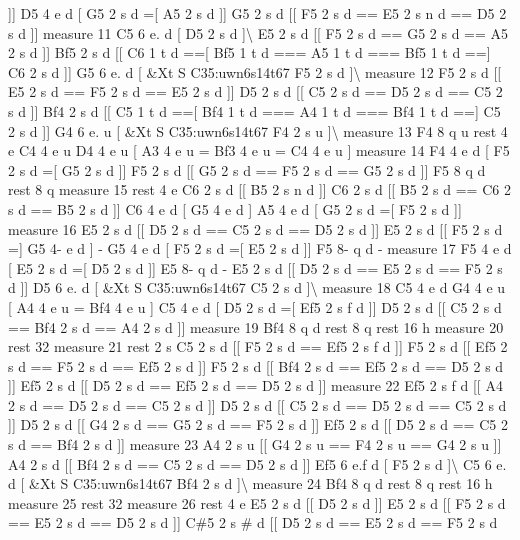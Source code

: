 \mbox{]}\mbox{]} D5 4 e d \mbox{[} G5 2 s d =\mbox{[} A5 2 s d \mbox{]}\mbox{]} G5 2 s d \mbox{[}\mbox{[} F5 2 s d == E5 2 s n d == D5 2 s d \mbox{]}\mbox{]} measure 11 C5 6 e. d \mbox{[} D5 2 s d \mbox{]}\textbackslash{} E5 2 s d \mbox{[}\mbox{[} F5 2 s d == G5 2 s d == A5 2 s d \mbox{]}\mbox{]} Bf5 2 s d \mbox{[}\mbox{[} C6 1 t d ==\mbox{[} Bf5 1 t d === A5 1 t d === Bf5 1 t d ==\mbox{]} C6 2 s d \mbox{]}\mbox{]} G5 6 e. d \mbox{[} \&Xt S C35\+:uwn6s14t67 F5 2 s d \mbox{]}\textbackslash{} measure 12 F5 2 s d \mbox{[}\mbox{[} E5 2 s d == F5 2 s d == E5 2 s d \mbox{]}\mbox{]} D5 2 s d \mbox{[}\mbox{[} C5 2 s d == D5 2 s d == C5 2 s d \mbox{]}\mbox{]} Bf4 2 s d \mbox{[}\mbox{[} C5 1 t d ==\mbox{[} Bf4 1 t d === A4 1 t d === Bf4 1 t d ==\mbox{]} C5 2 s d \mbox{]}\mbox{]} G4 6 e. u \mbox{[} \&Xt S C35\+:uwn6s14t67 F4 2 s u \mbox{]}\textbackslash{} measure 13 F4 8 q u rest 4 e C4 4 e u D4 4 e u \mbox{[} A3 4 e u = Bf3 4 e u = C4 4 e u \mbox{]} measure 14 F4 4 e d \mbox{[} F5 2 s d =\mbox{[} G5 2 s d \mbox{]}\mbox{]} F5 2 s d \mbox{[}\mbox{[} G5 2 s d == F5 2 s d == G5 2 s d \mbox{]}\mbox{]} F5 8 q d rest 8 q measure 15 rest 4 e C6 2 s d \mbox{[}\mbox{[} B5 2 s n d \mbox{]}\mbox{]} C6 2 s d \mbox{[}\mbox{[} B5 2 s d == C6 2 s d == B5 2 s d \mbox{]}\mbox{]} C6 4 e d \mbox{[} G5 4 e d \mbox{]} A5 4 e d \mbox{[} G5 2 s d =\mbox{[} F5 2 s d \mbox{]}\mbox{]} measure 16 E5 2 s d \mbox{[}\mbox{[} D5 2 s d == C5 2 s d == D5 2 s d \mbox{]}\mbox{]} E5 2 s d \mbox{[}\mbox{[} F5 2 s d =\mbox{]} G5 4-\/ e d \mbox{]} -\/ G5 4 e d \mbox{[} F5 2 s d =\mbox{[} E5 2 s d \mbox{]}\mbox{]} F5 8-\/ q d -\/ measure 17 F5 4 e d \mbox{[} E5 2 s d =\mbox{[} D5 2 s d \mbox{]}\mbox{]} E5 8-\/ q d -\/ E5 2 s d \mbox{[}\mbox{[} D5 2 s d == E5 2 s d == F5 2 s d \mbox{]}\mbox{]} D5 6 e. d \mbox{[} \&Xt S C35\+:uwn6s14t67 C5 2 s d \mbox{]}\textbackslash{} measure 18 C5 4 e d G4 4 e u \mbox{[} A4 4 e u = Bf4 4 e u \mbox{]} C5 4 e d \mbox{[} D5 2 s d =\mbox{[} Ef5 2 s f d \mbox{]}\mbox{]} D5 2 s d \mbox{[}\mbox{[} C5 2 s d == Bf4 2 s d == A4 2 s d \mbox{]}\mbox{]} measure 19 Bf4 8 q d rest 8 q rest 16 h measure 20 rest 32 measure 21 rest 2 s C5 2 s d \mbox{[}\mbox{[} F5 2 s d == Ef5 2 s f d \mbox{]}\mbox{]} F5 2 s d \mbox{[}\mbox{[} Ef5 2 s d == F5 2 s d == Ef5 2 s d \mbox{]}\mbox{]} F5 2 s d \mbox{[}\mbox{[} Bf4 2 s d == Ef5 2 s d == D5 2 s d \mbox{]}\mbox{]} Ef5 2 s d \mbox{[}\mbox{[} D5 2 s d == Ef5 2 s d == D5 2 s d \mbox{]}\mbox{]} measure 22 Ef5 2 s f d \mbox{[}\mbox{[} A4 2 s d == D5 2 s d == C5 2 s d \mbox{]}\mbox{]} D5 2 s d \mbox{[}\mbox{[} C5 2 s d == D5 2 s d == C5 2 s d \mbox{]}\mbox{]} D5 2 s d \mbox{[}\mbox{[} G4 2 s d == G5 2 s d == F5 2 s d \mbox{]}\mbox{]} Ef5 2 s d \mbox{[}\mbox{[} D5 2 s d == C5 2 s d == Bf4 2 s d \mbox{]}\mbox{]} measure 23 A4 2 s u \mbox{[}\mbox{[} G4 2 s u == F4 2 s u == G4 2 s u \mbox{]}\mbox{]} A4 2 s d \mbox{[}\mbox{[} Bf4 2 s d == C5 2 s d == D5 2 s d \mbox{]}\mbox{]} Ef5 6 e.\+f d \mbox{[} F5 2 s d \mbox{]}\textbackslash{} C5 6 e. d \mbox{[} \&Xt S C35\+:uwn6s14t67 Bf4 2 s d \mbox{]}\textbackslash{} measure 24 Bf4 8 q d rest 8 q rest 16 h measure 25 rest 32 measure 26 rest 4 e E5 2 s d \mbox{[}\mbox{[} D5 2 s d \mbox{]}\mbox{]} E5 2 s d \mbox{[}\mbox{[} F5 2 s d == E5 2 s d == D5 2 s d \mbox{]}\mbox{]} C\#5 2 s \# d \mbox{[}\mbox{[} D5 2 s d == E5 2 s d == F5 2 s d 